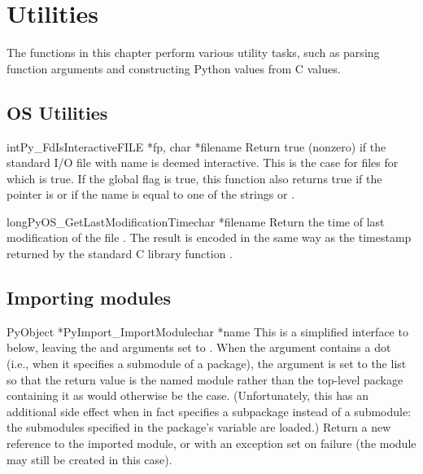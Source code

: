 \chapter{Utilities}

The functions in this chapter perform various utility tasks, such as
parsing function arguments and constructing Python values from C
values.

\section{OS Utilities}

\begin{cfuncdesc}{int}{Py_FdIsInteractive}{FILE *fp, char *filename}
Return true (nonzero) if the standard I/O file  with name
 is deemed interactive.  This is the case for files for
which  is true.  If the global flag
 is true, this function also returns true if
the  pointer is \NULL{} or if the name is equal to one of
the strings  or .
\end{cfuncdesc}

\begin{cfuncdesc}{long}{PyOS_GetLastModificationTime}{char *filename}
Return the time of last modification of the file .
The result is encoded in the same way as the timestamp returned by
the standard C library function .
\end{cfuncdesc}


\section{Importing modules}

\begin{cfuncdesc}{PyObject *}{PyImport_ImportModule}{char *name}
This is a simplified interface to 
below, leaving the  and  arguments set to
\NULL{}.  When the  argument contains a dot (i.e., when
it specifies a submodule of a package), the  argument is
set to the list \code{['*']} so that the return value is the named
module rather than the top-level package containing it as would
otherwise be the case.  (Unfortunately, this has an additional side
effect when  in fact specifies a subpackage instead of a
submodule: the submodules specified in the package's 
variable are loaded.)  Return a new reference to the imported module,
or \NULL{} with an exception set on failure (the module may still
be created in this case).
\end{cfuncdesc}

